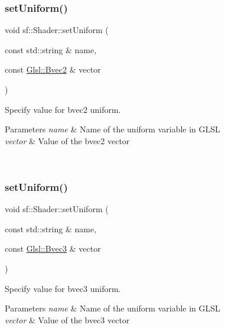 \subsubsection{\texorpdfstring{setUniform()}{setUniform()}\hspace{0.1cm}{\footnotesize\ttfamily [10/16]}}
{\footnotesize\ttfamily void sf\+::\+Shader\+::set\+Uniform (\begin{DoxyParamCaption}\item[{const std\+::string \&}]{name,  }\item[{const \mbox{\hyperlink{namespacesf_1_1_glsl_a59d8cf909c3d71ebf3db057480b464da}{Glsl\+::\+Bvec2}} \&}]{vector }\end{DoxyParamCaption})}



Specify value for {\ttfamily bvec2} uniform. 


\begin{DoxyParams}{Parameters}
{\em name} & Name of the uniform variable in G\+L\+SL \\
\hline
{\em vector} & Value of the bvec2 vector \begin{DoxyVerb}\end{DoxyVerb}
 \\
\hline
\end{DoxyParams}
\mbox{\label{classsf_1_1_shader_ab06830875c82476fbb9c975cdeb78a11}} 
\subsubsection{\texorpdfstring{setUniform()}{setUniform()}\hspace{0.1cm}{\footnotesize\ttfamily [11/16]}}
{\footnotesize\ttfamily void sf\+::\+Shader\+::set\+Uniform (\begin{DoxyParamCaption}\item[{const std\+::string \&}]{name,  }\item[{const \mbox{\hyperlink{namespacesf_1_1_glsl_a4166ffc506619b4912d576e6eba2c957}{Glsl\+::\+Bvec3}} \&}]{vector }\end{DoxyParamCaption})}



Specify value for {\ttfamily bvec3} uniform. 


\begin{DoxyParams}{Parameters}
{\em name} & Name of the uniform variable in G\+L\+SL \\
\hline
{\em vector} & Value of the bvec3 vector \begin{DoxyVerb}\end{DoxyVerb}
 \\
\hline
\end{DoxyParams}
\mbox{\label{classsf_1_1_shader_ac8db3e0adf1129abf24f0a51a7ec36f4}} 
